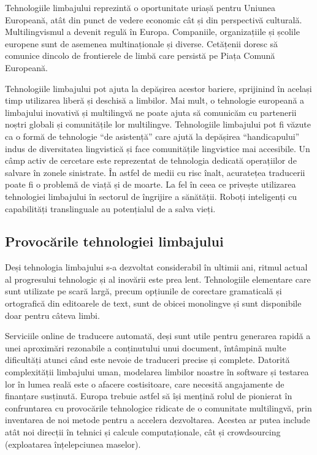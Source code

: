 \documentclass[]{../../metanetpaper}
\begin{document}
\begin{multicols}{2}
Tehnologiile limbajului reprezintă o oportunitate uriașă pentru Uniunea Europeană, atât din punct de vedere economic cât și din perspectivă culturală. Multilingvismul a devenit regulă în Europa. Companiile, organizațiile și școlile europene sunt de asemenea multinaționale și diverse. Cetățenii doresc să comunice dincolo de frontierele de limbă care persistă pe Piața Comună Europeană. 


Tehnologiile limbajului pot ajuta la depășirea acestor bariere, sprijinind în același timp utilizarea liberă și deschisă a limbilor. Mai mult, o tehnologie europeană a limbajului inovativă și multilingvă ne poate ajuta să comunicăm cu partenerii noștri globali și comunitățile lor multilingve. Tehnologiile limbajului pot fi văzute ca o formă de tehnologie “de asistență” care ajută la depășirea “handicapului” indus de diversitatea lingvistică și face comunitățile lingvistice mai accesibile.
Un câmp activ de cercetare este reprezentat de tehnologia dedicată operațiilor de salvare în zonele sinistrate. În astfel de medii cu risc înalt, acuratețea traducerii poate fi o problemă de viață și de moarte. La fel în ceea ce privește utilizarea tehnologiei limbajului în sectorul de îngrijire a sănătății. Roboți inteligenți cu capabilități translinguale au potențialul de a salva vieți.

\subsection{Provocările tehnologiei limbajului}

Deși tehnologia limbajului s-a dezvoltat considerabil în ultimii ani, ritmul actual al progresului tehnologic și al inovării este prea lent. Tehnologiile elementare care sunt utilizate pe scară largă, precum opțiunile de corectare gramaticală și ortografică din editoarele de text, sunt de obicei monolingve și sunt disponibile doar pentru câteva limbi. 


Serviciile online de traducere automată, deși sunt utile pentru generarea rapidă a unei aproximări rezonabile a conținutului unui document, întâmpină multe dificultăți atunci când este nevoie de traduceri precise și complete. Datorită complexității limbajului uman, modelarea limbilor noastre în software și testarea lor în lumea reală este o afacere costisitoare, care necesită angajamente de finanțare susținută. Europa trebuie astfel să își mențină rolul de pionierat în confruntarea cu provocările tehnologice ridicate de o comunitate multilingvă, prin inventarea de noi metode pentru a accelera dezvoltarea. Acestea ar putea include atât noi direcții în tehnici și calcule computaționale, cât și crowdsourcing (exploatarea înțelepciunea maselor).


\end{multicols}
\end{document}
